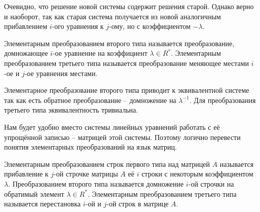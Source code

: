 \rm Очевидно, что решение новой системы содержит решения старой. Однако верно и наоборот, так как старая система получается из новой аналогичным прибавлением $i$-ого уравнения к $j$-ому, но с коэффициентом $-\lambda$.
\erm

\dfn  Элементарным преобразованием второго типа называется преобразование, домножающее $i$-ое уравнение на коэффициент $\lambda \in R^*$.
Элементарным преобразованием третьего типа называется преобразование меняющее местами $i$-ое и $j$-ое уравнения местами.
\edfn

\rm Элементарное преобразование второго типа приводит к эквивалентной системе так как есть обратное преобразование -- домножение на $\lambda^{-1}$. Для преобразования третьего типа эквивалентность тривиальна.
\erm





Нам будет удобно вместо системы линейных уравнений работать с её упрощённой записью -- матрицей этой системы. Поэтому логично перевести понятия элементарных преобразований на язык матриц.

\dfn Элементарным преобразованием строк первого типа над матрицей $A$ называется прибавление к $j$-ой строчке матрицы $A$ её $i$ строки с некоторым коэффициентом $\lambda$. Преобразованием второго типа называется домножение $i$-ой строчки на обратимый элемент $\lambda \in R^*$. Элементарным преобразованием третьего типа называется перестановка $i$-ой и $j$-ой строк в матрице $A$. 
\edfn

